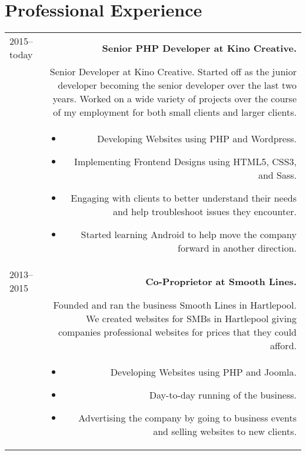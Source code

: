 \documentclass[10pt]{article}
\begin{document}
\section*{Professional Experience}
\begin{tabular}{L!{\VRule}R}
2015--today&{\bf Senior PHP Developer at Kino Creative.}\\
&Senior Developer at Kino Creative. Started off as the junior developer becoming the senior developer over the last two years. Worked on a wide variety of projects over the course of my employment for both small clients and larger clients.\\
&\begin{itemize}
\item Developing Websites using PHP and Wordpress.
\item Implementing Frontend Designs using HTML5, CSS3, and Sass.
\item Engaging with clients to better understand their needs and help troubleshoot issues they encounter.
\item Started learning Android to help move the company forward in another direction.
\end{itemize}\\
2013--2015&{\bf Co-Proprietor at Smooth Lines.}\\
&Founded and ran the business Smooth Lines in Hartlepool. We created websites for SMBs in Hartlepool giving companies professional websites for prices that they could afford.\\
&\begin{itemize}
\item Developing Websites using PHP and Joomla.
\item Day-to-day running of the business.
\item Advertising the company by going to business events and selling websites to new clients.
\end{itemize}\\
\end{tabular}
\end{document}
